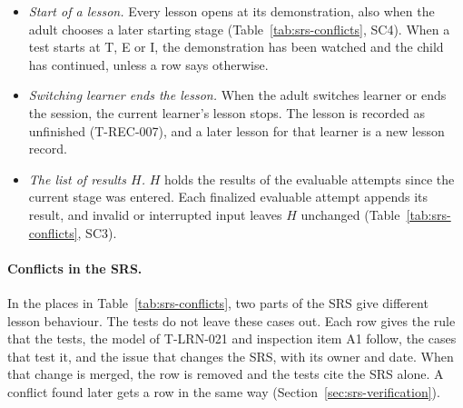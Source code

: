 \documentclass[12pt, titlepage]{article}
\begin{document}
\begin{itemize}
\begin{enumerate}
completeness and result of each attempt given directly; this is the only
way to set exact boundary values such as 44 or 45;
\item end to end in Playwright on the real interface, for the rows named in
each test. There, a written 40, 50 or 85 stands for a failing attempt, a
higher failing attempt or a passing attempt, and is replayed as
\texttt{circle-\allowbreak{}fail.json},
\texttt{circle-\allowbreak{}near-\allowbreak{}miss.json} or
\texttt{circle.json}, unless the test says otherwise. Playwright-only tests
that write 40 or 85 use the same mapping.
\end{enumerate}
The replayed files do not score the written numbers: their results lie in
the bands of the \texttt{CAL\_*} constants in Table~\ref{tab:symb-fr} (at
most 60, 70 to 79 and at least 90). These bands, not the written numbers,
give the needed pass, fail and improvement results end to end.
\item \emph{Start of a lesson.} Every lesson opens at its demonstration,
also when the adult chooses a later starting stage
(Table~\ref{tab:srs-conflicts}, SC4). When a test starts at T, E or I, the
demonstration has been watched and the child has continued, unless a row
says otherwise.
\item \emph{Switching learner ends the lesson.} When the adult switches
learner or ends the session, the current learner's lesson stops. The lesson
is recorded as unfinished (T-REC-007), and a later lesson for that learner
is a new lesson record.
\item \emph{The list of results $H$.} $H$ holds the results of the
evaluable attempts since the current stage was entered. Each finalized
evaluable attempt appends its result, and invalid or interrupted input
leaves $H$ unchanged (Table~\ref{tab:srs-conflicts}, SC3).
\end{itemize}

\paragraph{Conflicts in the SRS.} In the places in
Table~\ref{tab:srs-conflicts}, two parts of the SRS give different lesson
behaviour. The tests do not leave these cases out. Each row gives the rule
that the tests, the model of T-LRN-021 and inspection item A1 follow, the
cases that test it, and the issue that changes the SRS, with its owner and
date. When that change is merged, the row is removed and the tests cite the
SRS alone. A conflict found later gets a row in the same way
(Section~\ref{sec:srs-verification}).
\end{document}
